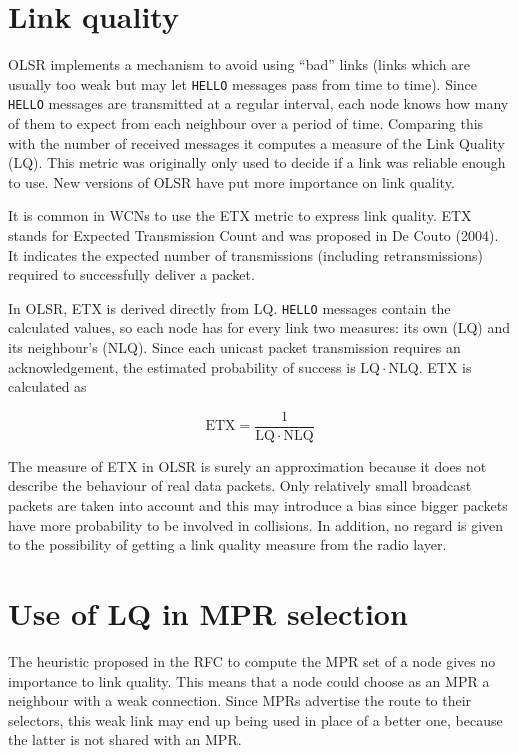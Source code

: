 \documentclass[a4paper,11pt,twoside,openleft]{memoir}
\newcommand{\etx}{\mathrm{ETX}}
\newcommand{\linkq}{\mathrm{LQ}}
\newcommand{\nlq}{\mathrm{NLQ}}
\begin{document}
\section{Link quality}\label{link-quality}

OLSR implements a mechanism to avoid using ``bad'' links (links which
are usually too weak but may let \texttt{HELLO} messages pass from time
to time). Since \texttt{HELLO} messages are transmitted at a regular
interval, each node knows how many of them to expect from each neighbour
over a period of time. Comparing this with the number of received
messages it computes a measure of the Link Quality (LQ). This metric was
originally only used to decide if a link was reliable enough to use. New
versions of OLSR have put more importance on link quality.

It is common in WCNs to use the ETX metric to express link quality. ETX
stands for Expected Transmission Count and was proposed in De Couto
(2004). It indicates the expected number of transmissions (including
retransmissions) required to successfully deliver a packet.

In OLSR, ETX is derived directly from LQ. \texttt{HELLO} messages
contain the calculated values, so each node has for every link two
measures: its own (LQ) and its neighbour's (NLQ). Since each unicast packet
transmission requires an acknowledgement, the estimated probability of
success is $\linkq \cdot \nlq$. ETX is calculated as

\begin{equation}
\etx = \frac{1}{\linkq \cdot \nlq}
\end{equation}

The measure of ETX in OLSR is surely an approximation because it does not
describe the behaviour of real data packets. Only relatively small broadcast
packets are taken into account and this may introduce a bias since bigger
packets have more probability to be involved in collisions.
In addition, no regard is given to the possibility of getting a link quality
measure from the radio layer.

\section{Use of LQ in MPR selection}\label{use-of-lq-in-mpr-selection}

The heuristic proposed in the RFC to compute the MPR set of a node gives
no importance to link quality. This means that a node could choose as an
MPR a neighbour with a weak connection. Since MPRs advertise the route
to their selectors, this weak link may end up being used in place of a
better one, because the latter is not shared with an MPR.
\end{document}
